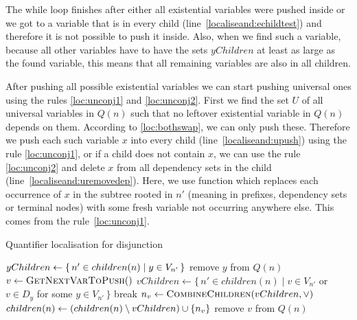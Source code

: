 \documentclass[
  digital, %
  color,
  twoside, %
  table,   %
  nolof,     %
  nolot,     %
]{fithesis3}
\let\setbuilder\set
\newcommand{\simpleset}[1]{\{{#1}\}}
\renewcommand{\set}[1]{\normalexpandarg\IfSubStr{#1}{|}{\setbuilder{#1}}{\simpleset{#1}}}
\theoremstyle{definition}
\theoremstyle{remark}
\newcommand{\vars}[1]{V_{#1}}
\newcommand{\prefix}[1]{Q({#1})}
\newcommand{\eprefix}[1]{Q_{\exists}(#1)}
\newcommand{\children}[1]{children({#1})}
\begin{document}
The while loop finishes after either all existential variables were pushed inside or we got to a variable that is in every child (line~\ref{localiseand:echildtest}) and therefore it is not possible to push it inside. Also, when we find such a variable, because all other variables have to have the sets $yChildren$ at least as large as the found variable, this means that all remaining variables are also in all children.

After pushing all possible existential variables we can start pushing universal ones using the rules \eqref{loc:unconj1} and \eqref{loc:unconj2}. First we find the set $U$ of all universal variables in $\prefix{n}$ such that no leftover existential variable in $\prefix{n}$ depends on them. According to \eqref{loc:bothswap}, we can only push these. Therefore we push each such variable $x$ into every child (line~\ref{localiseand:upush}) using the rule \eqref{loc:unconj1}, or if a child does not contain $x$, we can use the rule \eqref{loc:unconj2} and delete $x$ from all dependency sets in the child (line~\ref{localiseand:uremovedep}). Here, we use function  which replaces each occurrence of $x$ in the subtree rooted in $n'$ (meaning in prefixes, dependency sets or terminal nodes) with some fresh variable not occurring anywhere else. This comes from the rule~\eqref{loc:unconj1}.

\begin{algorithm}[t!]
  \caption{Quantifier localisation for disjunction}
  \label{alg:localiseor}
  \begin{algorithmic}[1]
      \ForAll{$y \in \eprefix{n}$}\label{localiseor:estart}
        \State $yChildren \gets \set{n' \in \children{n} | y \in \vars{n'}}$\label{localiseor:egetchildren}
        \label{localiseor:checkconditions}
            \State {}\label{localiseor:epush}
            \State {}\label{localiseor:efreshvar}
          \EndFor
          \State remove $y$ from $\prefix{n}$
        \EndIf
      \EndFor\label{localiseor:eend}
      \While{$\prefix{n}$ is not empty}\label{localiseor:bstart}
        \State $v \gets \Call{GetNextVarToPush}{\null}$\label{localiseor:getnextvar}
        \State $vChildren \gets \{\,n' \in \children{n} \mid v \in \vars{n'}$  or  $v \in D_y$ for\label{localiseor:bgetchildren}
        \Statex \hspace{9cm} some $y \in \vars{n'}\,\}$
        \If{$vChildren = \children{n}$}\label{localiseor:bcompare}
          \State break
        \Else
          \State $n_v \gets \Call{CombineChildren}{vChildren, {\lor}}$\label{localiseor:bcombine}
          \State $\children{n} \gets (\children{n} \setminus vChildren) \cup \set{n_v}$\label{localiseor:bupdatechildren}
          \State {}\label{localiseor:bpush}
          \State remove $v$ from $\prefix{n}$\label{localiseor:bremove}
        \EndIf
      \EndWhile\label{localiseor:bend}
    \EndFunction
  \end{algorithmic}
\end{algorithm}
\end{document}
